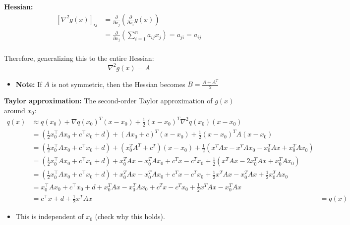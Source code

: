 \begin{example}
    \textbf{Hessian:}
    \begin{align*}
        \left[ \nabla^2 g(x) \right]_{ij} &= \frac{\partial}{\partial x_j} \left( \frac{\partial}{\partial x_i} g(x) \right) \\
        & = \frac{\partial}{\partial x_j} \left( \sum_{i=1}^{n} a_{ij} x_j \right) = a_{ji} = a_{ij} \\
        \end{align*}
    
    Therefore, generalizing this to the entire Hessian: 
    \begin{equation*}
        \nabla^2 g(x) = A 
    \end{equation*}
    \begin{itemize}
        \item \textbf{Note:} If $A$ is not symmetric, then the Hessian becomes $B = \frac{A + A^T}{2}$
    \end{itemize}
    \vspace{1em}

    \textbf{Taylor approximation:} The second-order Taylor approximation of \( g(x) \) around \( x_0 \):
        \begin{align*}
            q(x) &\approx q(x_0) + \nabla q(x_0)^T (x - x_0) + \frac{1}{2} (x - x_0)^T \nabla^2 q(x_0) (x - x_0) \\
            &= \left(\frac{1}{2} x_0^\top A x_0 + c^\top x_0 + d\right) + (A x_0 + c)^T (x - x_0) + \frac{1}{2} (x - x_0)^T A (x - x_0) \\
            &= \left(\frac{1}{2} x_0^\top A x_0 + c^\top x_0 + d\right) + (x_0^T A^T + c^T) (x-x_0) + \frac{1}{2} (x^T A x - x^T Ax_0 -x_0^T A x + x_0^T A x_0) \\
            &= \left(\frac{1}{2} x_0^\top A x_0 + c^\top x_0 + d\right) + x_0^T A x - x_0^T A x_0 + c^T x - c^T x_0 + \frac{1}{2} (x^T A x -2 x_0^T A x + x_0^T A x_0) \\
            &= \left(\frac{1}{2} x_0^\top A x_0 + c^\top x_0 + d\right) + x_0^T A x - x_0^T A x_0 + c^T x - c^T x_0 + \frac{1}{2}x^T A x - x_0^T A x + \frac{1}{2} x_0^T A x_0 \\
            &= x_0^\top A x_0 + c^\top x_0 + d + x_0^T A x - x_0^T A x_0 + c^T x - c^T x_0 + \frac{1}{2}x^T A x - x_0^T A x \\
            &= c^\top x + d + \frac{1}{2}x^T A x 
            &= q(x)
        \end{align*}
        \begin{itemize}
            \item This is independent of $x_0$ (check why this holds).
        \end{itemize}

\end{example}

